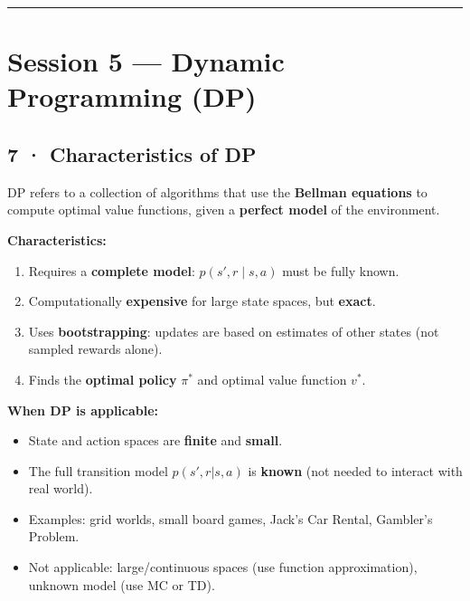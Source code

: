 \documentclass[11pt,a4paper]{article}
\begin{document}
\hrule\vspace{8pt}

\section*{Session 5 — Dynamic Programming (DP)}

\subsection*{7 · Characteristics of DP}

\begin{tcolorbox}[defn={What is DP in the RL context?}]
DP refers to a collection of algorithms that use the \textbf{Bellman equations} to compute
optimal value functions, given a \textbf{perfect model} of the environment.
\end{tcolorbox}

\textbf{Characteristics:}
\begin{enumerate}
  \item Requires a \textbf{complete model}: $p(s', r \mid s, a)$ must be fully known.
  \item Computationally \textbf{expensive} for large state spaces, but \textbf{exact}.
  \item Uses \textbf{bootstrapping}: updates are based on estimates of other states (not sampled rewards alone).
  \item Finds the \textbf{optimal policy} $\pi^*$ and optimal value function $v^*$.
\end{enumerate}

\textbf{When DP is applicable:}
\begin{itemize}
  \item State and action spaces are \textbf{finite} and \textbf{small}.
  \item The full transition model $p(s',r|s,a)$ is \textbf{known} (not needed to interact with real world).
  \item Examples: grid worlds, small board games, Jack's Car Rental, Gambler's Problem.
  \item Not applicable: large/continuous spaces (use function approximation), unknown model (use MC or TD).
\end{itemize}

\end{document}
